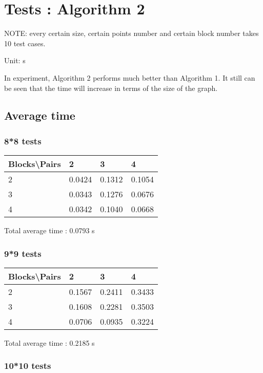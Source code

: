 \documentclass[12pt, a4paper]{article}
\begin{document}
	\section{Tests : Algorithm 2}

		NOTE: every certain size, certain points number and certain block number takes 10 test cases.

		Unit: s

		In experiment, Algorithm 2 performs much better than Algorithm 1. It still can be seen that the time will increase in terms of the size of the graph.

		\subsection{Average time}

			\subsubsection{8*8 tests}

				\begin{tabular}[h]{|l|l|l|l|}
				\hline
				Blocks\textbackslash Pairs & 2 & 3 & 4 \\
				\hline
				2 & 0.0424 & 0.1312 & 0.1054 \\
				\hline
				3 & 0.0343 & 0.1276 & 0.0676 \\
				\hline
				4 & 0.0342 & 0.1040 & 0.0668 \\
				\hline
				\end{tabular}

				Total average time : 0.0793 s

			\subsubsection{9*9 tests}

				\begin{tabular}[h]{|l|l|l|l|}
				\hline
				Blocks\textbackslash Pairs & 2 & 3 & 4 \\
				\hline
				2 & 0.1567 & 0.2411 & 0.3433 \\
				\hline
				3 & 0.1608 & 0.2281 & 0.3503 \\
				\hline
				4 & 0.0706 & 0.0935 & 0.3224 \\
				\hline
				\end{tabular}

				Total average time : 0.2185 s

			\subsubsection{10*10 tests}
\end{document}
